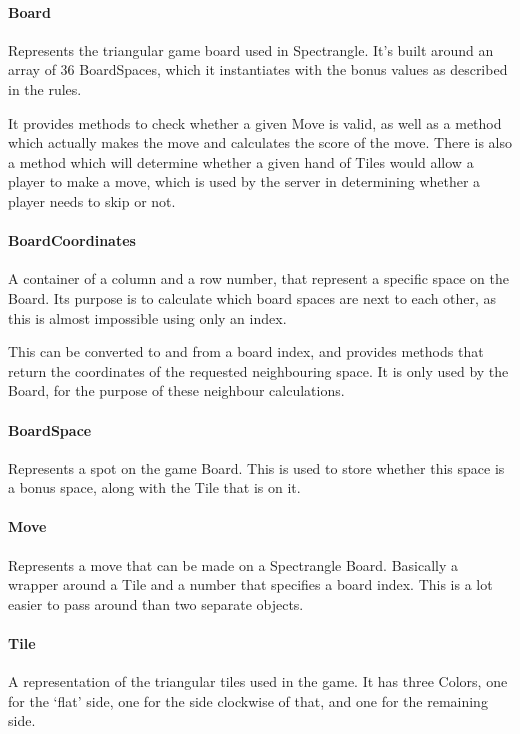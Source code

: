 \documentclass[12pt, letterpaper]{article}
\begin{document}
    \paragraph{Board}
    Represents the triangular game board used in Spectrangle.
    It's built around an array of 36 BoardSpaces, which it instantiates with the bonus values as described in the rules.

    It provides methods to check whether a given Move is valid, as well as a method which actually makes the move
    and calculates the score of the move.
    There is also a method which will determine whether a given hand of Tiles would allow a player to make a move,
    which is used by the server in determining whether a player needs to skip or not.

    \paragraph{BoardCoordinates}
    A container of a column and a row number, that represent a specific space on the Board.
    Its purpose is to calculate which board spaces are next to each other, as this is almost
    impossible using only an index.

    This can be converted to and from a board index, and provides methods that return the coordinates of
    the requested neighbouring space.
    It is only used by the Board, for the purpose of these neighbour calculations.

    \paragraph{BoardSpace}
    Represents a spot on the game Board.
    This is used to store whether this space is a bonus space, along with the Tile that is on it.

    \paragraph{Move}
    Represents a move that can be made on a Spectrangle Board.
    Basically a wrapper around a Tile and a number that specifies a board index.
    This is a lot easier to pass around than two separate objects.

    \paragraph{Tile}
    A representation of the triangular tiles used in the game.
    It has three Colors, one for the `flat' side, one for the side clockwise of that, and one for the remaining side.
\end{document}
